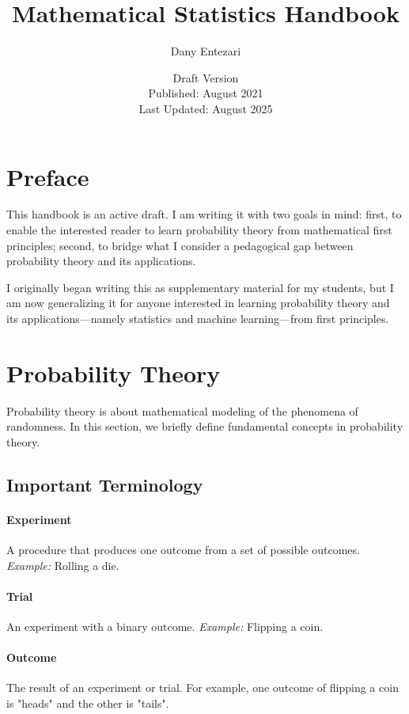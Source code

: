 \documentclass{article}
\title{Mathematical Statistics Handbook}
\author{Dany Entezari}
\date{Draft Version \\
Published: August 2021 \\
Last Updated: August 2025}
\begin{document}
\maketitle
\tableofcontents

\newpage
\section{Preface}
This handbook is an active draft. I am writing it with two goals in mind: first, to enable the interested reader to learn probability theory from mathematical first principles; second, to bridge what I consider a pedagogical gap between probability theory and its applications.

I originally began writing this as supplementary material for my students, but I am now generalizing it for anyone interested in learning probability theory and its applications—namely statistics and machine learning—from first principles.


\newpage
\section{Probability Theory}

Probability theory is about mathematical modeling of the phenomena of randomness. In this section, we briefly define fundamental concepts in probability theory.

\subsection{Important Terminology}

\paragraph{Experiment} 
A procedure that produces one outcome from a set of possible outcomes.  
\textit{Example:} Rolling a die.

\paragraph{Trial}
An experiment with a binary outcome. \textit{Example:} Flipping a coin.

\paragraph{Outcome}
The result of an experiment or trial. For example, one outcome of flipping a coin is "heads" and the other is "tails".
\end{document}
